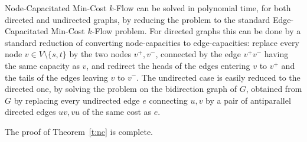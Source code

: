 \documentclass[envcountsame]{llncs}
\begin{document}
{\sf Node-Capacitated Min-Cost $k$-Flow} can be solved in polynomial time, for both directed and undirected graphs,
by reducing the problem to the standard {\sf Edge-Capacitated Min-Cost $k$-Flow} problem.
For directed graphs this can be done by a standard reduction of converting node-capacities
to edge-capacities: replace every node $v \in V \setminus\{s,t\}$ by the two
nodes $v^+,v^-$, connected by the edge $v^+v^-$ having the same capacity as $v$, and redirect the
heads of the edges entering $v$ to $v^+$ and the tails of the edges leaving $v$ to $v^-$.
The undirected case is easily reduced to the directed one, by solving the problem on the 
bidirection graph of $G$, obtained from $G$ by replacing every undirected edge $e$ connecting $u,v$
by a pair of antiparallel directed edges $uv,vu$ of the same cost as $e$.

The proof of Theorem~\ref{t:nc} is complete.



\end{document}
